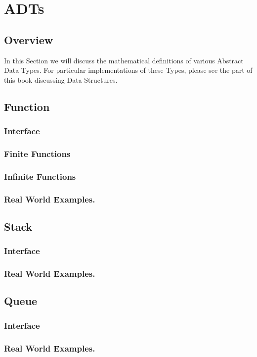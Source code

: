 \documentclass[12pt, letterpaper]{book}
\begin{document}
\chapter{ADTs} \label{ADTs}

	\section{Overview}

	In this Section we will discuss the mathematical definitions of various Abstract Data Types. For particular implementations of these Types, please see the part of this book discussing Data Structures.

\section{Function}
	\subsection{Interface}
	\subsection{Finite Functions}
	\subsection{Infinite Functions}
	\subsection{Real World Examples.}
\section{Stack}
	\subsection{Interface}
	\subsection{Real World Examples.}
\section{Queue}
	\subsection{Interface}
	\subsection{Real World Examples.}
\end{document}
